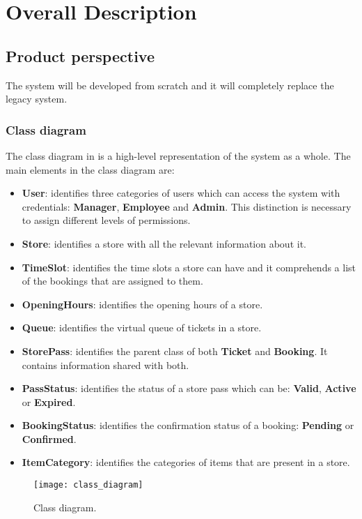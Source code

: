 \chapter{Overall Description}

\section{Product perspective}

The system will be developed from scratch and it will completely replace the legacy system.
\subsection{Class diagram}
The class diagram in  is a high-level representation of the system as a whole.\newline
The main elements in the class diagram are:
\begin{itemize}
	\item \textbf{User}: identifies three categories of users which can access the system with credentials: \textbf{Manager}, \textbf{Employee} and \textbf{Admin}. This distinction is necessary to assign different levels of permissions. 
	\item \textbf{Store}: identifies a store with all the relevant information about it.
	\item \textbf{TimeSlot}: identifies the time slots a store can have and it comprehends a list of the bookings that are assigned to them.
	\item \textbf{OpeningHours}: identifies the opening hours of a store.
	\item \textbf{Queue}: identifies the virtual queue of tickets in a store.
	\item \textbf{StorePass}: identifies the parent class of both \textbf{Ticket} and \textbf{Booking}. It contains information shared with both.
	\item \textbf{PassStatus}: identifies the status of a store pass which can be: \textbf{Valid}, \textbf{Active} or \textbf{Expired}.
	\item \textbf{BookingStatus}: identifies the confirmation status of a booking: \textbf{Pending} or \textbf{Confirmed}.
	\item \textbf{ItemCategory}: identifies the categories of items that are present in a store. 
\end{itemize}

\begin{figure}[H]
	\centering
	\texttt{[image: class\_diagram]}
	\caption{Class diagram.}
	\label{fig:class_diagram}
\end{figure}

